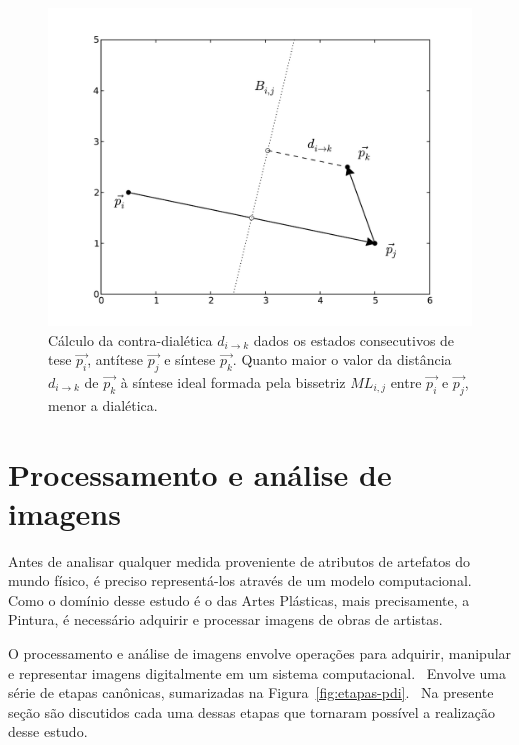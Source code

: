 \begin{figure}[ht!]
\begin{center}
        \includegraphics[scale=.6]{figs/desc_dialetica.pdf}
      \caption{Cálculo da contra-dialética $d_{i \rightarrow k}$ dados os
        estados consecutivos de tese $\vec{p_i}$, antítese $\vec{p_j}$ e síntese
        $\vec{p_k}$. Quanto maior o valor da distância $d_{i \rightarrow k}$ de
        $\vec{p_k}$ à síntese ideal formada pela bissetriz $ML_{i,j}$ entre
        $\vec{p_i}$ e $\vec{p_j}$, menor a dialética.  }
        \label{fig:desc_dialetica}
\end{center}
\end{figure}

\section{Processamento e análise de imagens}
\label{sec:fund:imagens}

Antes de analisar qualquer medida proveniente de atributos de artefatos do mundo
físico, é preciso representá-los através de um modelo computacional. Como o
domínio desse estudo é o das Artes Plásticas, mais precisamente, a Pintura, é
necessário adquirir e processar imagens de obras de artistas.

O processamento e análise de imagens envolve operações para adquirir, manipular
e representar imagens digitalmente em um sistema computacional.~\cite{gonzalez} Envolve uma
série de etapas canônicas, sumarizadas na Figura~\ref{fig:etapas-pdi}.~\cite{luciano} Na
presente seção são discutidos cada uma dessas etapas que tornaram possível a
realização desse estudo.

